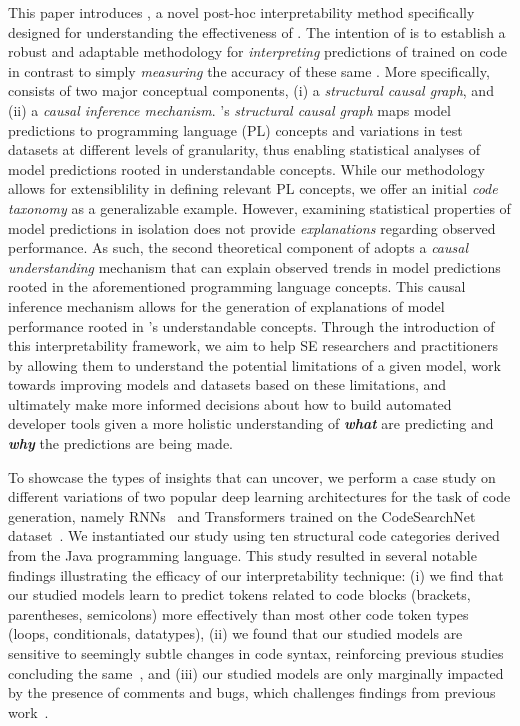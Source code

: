 This paper introduces \codegen, a novel post-hoc interpretability method specifically designed for understanding the effectiveness of \nlms. The intention of \codegen is to establish a robust and adaptable methodology for \textit{interpreting} predictions of \nlms trained on code in contrast to simply \textit{measuring} the accuracy of these same \nlms. More specifically, \codegen consists of two major conceptual components, (i) a \textit{structural causal graph}, and (ii) a \textit{causal inference mechanism}. \codegen's \textit{structural causal graph} maps model predictions to programming language (PL) concepts and variations in test datasets at different levels of granularity, thus enabling statistical analyses of model predictions rooted in understandable concepts. While our methodology allows for extensiblility in defining relevant PL concepts, we offer an initial \textit{code taxonomy} as a generalizable example. However, examining statistical properties of model predictions in isolation does not provide \textit{explanations} regarding observed performance. As such, the second theoretical component of \codegen adopts a \textit{causal understanding} mechanism that can explain observed trends in model predictions rooted in the aforementioned programming language concepts. This causal inference mechanism allows for the generation of explanations of model performance rooted in \codegen's understandable concepts. Through the introduction of this interpretability framework, we aim to help SE researchers and practitioners by allowing them to understand the potential limitations of a given model, work towards improving models and datasets based on these limitations, and ultimately make more informed decisions about how to build automated developer tools given a more holistic understanding of \textit{\textbf{what}} \nlms are predicting and \textit{\textbf{why}} the predictions are being made.

To showcase the types of insights that \codegen can uncover, we perform a case study on different variations of two popular deep learning architectures for the task of code generation, namely RNNs~\citep{RNNs} and Transformers \citep{vaswani2017transformers} trained on the CodeSearchNet dataset~\citep{husain2019codesearchnet}. We instantiated our study using ten structural code categories derived from the Java programming language. This study resulted in several notable findings illustrating the efficacy of our interpretability technique: (i) we find that our studied models learn to predict tokens related to code blocks (\eg brackets, parentheses, semicolons) more effectively than most other code token types (\eg loops, conditionals, datatypes), (ii) we found that our studied models are sensitive to seemingly subtle changes in code syntax, reinforcing previous studies concluding the same~\citep{rabin2021generalizability}, and (iii) our studied models are only marginally impacted by the presence of comments and bugs, which challenges findings from previous work~\citep{Baishakhi2016buggy}.

